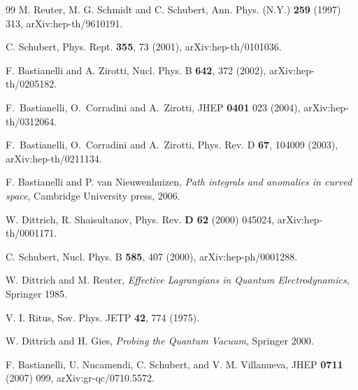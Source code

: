 \documentclass[a4paper,11pt]{article}
\begin{document}
\begin{thebibliography}{99}
M. Reuter, M. G. Schmidt and C. Schubert, 
Ann. Phys. (N.Y.) {\bf 259} (1997) 313, arXiv:hep-th/9610191. 


C. Schubert, 
Phys. Rept. {\bf 355}, 73 (2001), arXiv:hep-th/0101036.  

F. Bastianelli and A. Zirotti, Nucl. Phys. B {\bf 642}, 372 (2002), arXiv:hep-th/0205182.

F.~Bastianelli, O.~Corradini and A.~Zirotti,
JHEP {\bf 0401} 023 (2004), arXiv:hep-th/0312064.  %

  F.~Bastianelli, O.~Corradini and A.~Zirotti,
  Phys. Rev. D {\bf 67}, 104009 (2003), arXiv:hep-th/0211134.

F. Bastianelli and P. van Nieuwenhuizen, 
{\it Path integrals and anomalies in curved space}, 
Cambridge University press, 2006. 


W. Dittrich, R. Shaisultanov, Phys. Rev. {\bf D 62} (2000) 045024, arXiv:hep-th/0001171.


C. Schubert,
Nucl. Phys. B {\bf 585}, 407 (2000), arXiv:hep-ph/0001288.



W. Dittrich and M. Reuter, {\it Effective Lagrangians in Quantum Electrodynamics}, Springer 1985.

V. I. Ritus, %
Sov. Phys. JETP {\bf42}, 774 (1975).  

W. Dittrich and H. Gies, {\it Probing the Quantum Vacuum}, Springer 2000.

F. Bastianelli, U. Nucamendi, C. Schubert, and V. M. Villanueva, 
JHEP {\bf 0711} (2007) 099, arXiv:gr-qc/0710.5572.



\end{thebibliography}
\end{document}
